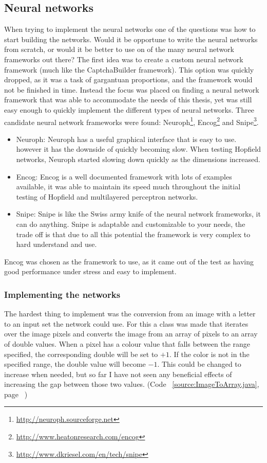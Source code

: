 \documentclass[pdftex,a4paper,12pt,twoside]{report}
\theoremstyle{plain} \newtheorem{theorem}{Theorem} \newtheorem{proposition}{Proposition} \newtheorem{lemma}{Lemma} \newtheorem*{corollary}{Corollary}
\theoremstyle{definition} \newtheorem{definition}{Definition} \newtheorem{conjecture}{Conjecture} \newtheorem*{example}{Example} \newtheorem{algorithm}{Algorithm}
\theoremstyle{remark} \newtheorem*{remark}{Remark} \newtheorem*{note}{Note} \newtheorem{case}{Case}
\begin{document}
\subsection{Neural networks}
When trying to implement the neural networks one of the questions was how to start building the networks. Would it be opportune to write the neural networks from scratch, or would it be better to use on of the many neural network frameworks out there? The first idea was to create a custom neural network framework (much like the CaptchaBuilder framework). This option was quickly dropped, as it was a task of gargantuan proportions, and the framework would not be finished in time. Instead the focus was placed on finding a neural network framework that was able to accommodate the needs of this thesis, yet was still easy enough to quickly implement the different types of neural networks. Three candidate neural network frameworks were found: Neuroph\footnote{\url{http://neuroph.sourceforge.net}}, Encog\footnote{\url{http://www.heatonresearch.com/encog}} and Snipe\footnote{\url{http://www.dkriesel.com/en/tech/snipe}}.
\begin{itemize}
\item Neuroph: Neuroph has a useful graphical interface that is easy to use. however it has the downside of quickly becoming slow. When testing Hopfield networks, Neuroph started slowing down quickly as the dimensions increased.
\item Encog: Encog is a well documented framework with lots of examples available, it was able to maintain its speed much throughout the initial testing of Hopfield and multilayered perceptron networks.
\item Snipe: Snipe is like the Swiss army knife of the neural network frameworks, it can do anything. Snipe is adaptable and customizable to your needs, the trade off is that due to all this potential the framework is very complex to hard understand and use.
\end{itemize}
Encog was chosen as the framework to use, as it came out of the test as having good performance under stress and easy to implement.
\subsubsection{Implementing the networks}
The hardest thing to implement was the conversion from an image with a letter to an input set the network could use. For this a class was made that iterates over the image pixels and converts the image from an array of pixels to an array of double values. When a pixel has a colour value that falls between the range specified, the corresponding double will be set to $+1$. If the color is not in the specified range, the double value will become $-1$. This could be changed to increase when needed, but so far I have not seen any beneficial effects of increasing the gap between those two values. (Code ~\ref{source:ImageToArray.java}, page ~\pageref{source:ImageToArray.java})
\end{document}
